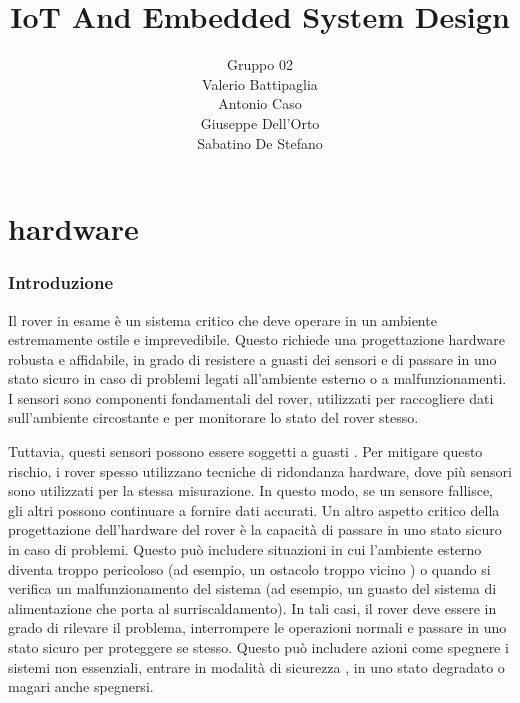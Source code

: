 \documentclass{article}
\title{IoT And Embedded System Design}
\author{
    Gruppo 02 \\
    Valerio Battipaglia \\
    Antonio Caso \\
    Giuseppe Dell'Orto\\
    Sabatino De Stefano \\
}
\begin{document}

\tableofcontents
\newpage

\part{hardware}
\section{Introduzione}

Il  rover in esame  è un sistema critico che deve operare in un ambiente estremamente ostile e imprevedibile. Questo richiede una progettazione hardware robusta e affidabile, in grado di resistere a guasti dei sensori e di passare in uno stato sicuro in caso di problemi legati all’ambiente esterno o a malfunzionamenti.
I sensori sono componenti fondamentali del rover, utilizzati per raccogliere dati sull’ambiente circostante e per monitorare lo stato del rover stesso.

Tuttavia, questi sensori possono essere soggetti a guasti . Per mitigare questo rischio, i rover spesso utilizzano tecniche di ridondanza hardware, dove più sensori sono utilizzati per la stessa misurazione. In questo modo, se un sensore fallisce, gli altri possono continuare a fornire dati accurati.
Un altro aspetto critico della progettazione dell’hardware del rover è la capacità di passare in uno stato sicuro in caso di problemi. Questo può includere situazioni in cui l’ambiente esterno diventa troppo pericoloso (ad esempio, un ostacolo troppo vicino ) o quando si verifica un malfunzionamento del sistema (ad esempio, un guasto del sistema di alimentazione che porta al surriscaldamento). In tali casi, il rover deve essere in grado di rilevare il problema, interrompere le operazioni normali e passare in uno stato sicuro per proteggere se stesso. Questo può includere azioni come spegnere i sistemi non essenziali, entrare in modalità di sicurezza , in uno stato degradato o magari anche spegnersi.
\end{document}
